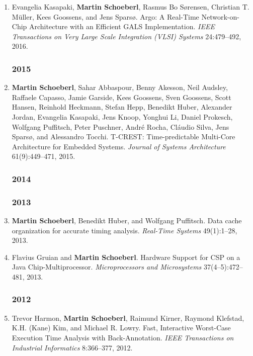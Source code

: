 \begin{enumerate}
\item Evangelia Kasapaki, {\bf Martin Schoeberl}, Rasmus Bo S{\o}rensen, Christian T. M\"uller, Kees Goossens, and Jens Spars{\o}.
 Argo: A Real-Time Network-on-Chip Architecture with an Efficient GALS Implementation.
 \emph{IEEE Transactions on Very Large Scale Integration (VLSI) Systems} 24:479--492, 2016.


\subsubsection*{2015}

\item {\bf Martin Schoeberl}, Sahar Abbaspour, Benny Akesson, Neil Audsley, Raffaele Capasso, Jamie Garside, Kees Goossens, Sven Goossens, Scott Hansen, Reinhold Heckmann, Stefan Hepp, Benedikt Huber, Alexander Jordan, Evangelia Kasapaki, Jens Knoop, Yonghui Li, Daniel Prokesch, Wolfgang Puffitsch, Peter Puschner, Andr\'{e} Rocha, Cl\'{a}udio Silva, Jens Spars{\o}, and Alessandro Tocchi.
 T-CREST: Time-predictable Multi-Core Architecture for Embedded Systems.
 \emph{Journal of Systems Architecture} 61(9):449--471, 2015.


\subsubsection*{2014}


\subsubsection*{2013}

\item {\bf Martin Schoeberl}, Benedikt Huber, and Wolfgang Puffitsch.
 Data cache organization for accurate timing analysis.
 \emph{Real-Time Systems} 49(1):1--28, 2013.

\item Flavius Gruian and {\bf Martin Schoeberl}.
 Hardware Support for CSP on a Java Chip-Multiprocessor.
 \emph{Microprocessors and Microsystems} 37(4--5):472--481, 2013.


\subsubsection*{2012}

\item Trevor Harmon, {\bf Martin Schoeberl}, Raimund Kirner, Raymond Klefstad, K.H. (Kane) Kim, and Michael R. Lowry.
 Fast, Interactive Worst-Case Execution Time Analysis with Back-Annotation.
 \emph{IEEE Transactions on Industrial Informatics} 8:366--377, 2012.


\end{enumerate}
